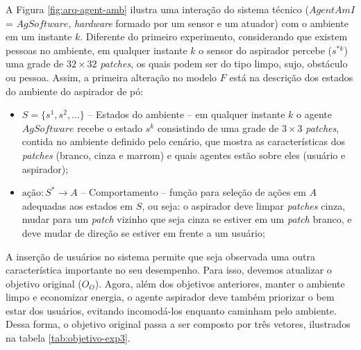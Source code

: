 A Figura \ref{fig:arq-agent-amb} ilustra uma interação do sistema técnico ($AgentAmI$ = $AgSoftware$, \textit{hardware} formado por um sensor e um atuador) com o ambiente em um instante $k$. Diferente do primeiro experimento, considerando que existem pessoas no ambiente, em qualquer instante $k$ o sensor do aspirador percebe ($s^{*k}$) uma grade de $32 \times 32$ \textit{patches}, os quais podem ser do tipo limpo, sujo, obstáculo ou pessoa. Assim, a primeira alteração no modelo $F$ está na descrição dos estados do ambiente do aspirador de pó:

\begin{itemize}
    \item $S = \{s^1, s^2, \ldots\}$ --	Estados do ambiente – em qualquer instante $k$ o agente $AgSoftware$ recebe o estado $s^k$ consistindo de uma grade de $3\times3$ \textit{patches}, contida no ambiente definido pelo cenário, que mostra as características dos \textit{patches} (branco, cinza e marrom) e quais agentes estão sobre eles (usuário e aspirador);
    
    \item $\textrm{ação} : S^*  \rightarrow A$ -- Comportamento – função para seleção de ações em $A$ adequadas aos estados em $S$, ou seja: o aspirador deve limpar \textit{patches} cinza, mudar para um \textit{patch} vizinho que seja cinza se estiver em um \textit{patch} branco, e deve mudar de direção se estiver em frente a um usuário;
    
\end{itemize}

A inserção de usuários no sistema permite que seja observada uma outra característica importante no seu desempenho. Para isso, devemos atualizar o objetivo original ($O_O$). Agora, além dos objetivos anteriores, manter o ambiente limpo e economizar energia, o agente aspirador deve também priorizar o bem estar dos usuários, evitando incomodá-los enquanto caminham pelo ambiente. Dessa forma, o objetivo original passa a ser composto por três vetores, ilustrados na tabela \ref{tab:objetivo-exp3}.

\begin{table}[h!]   
    \centering
\end{table}

